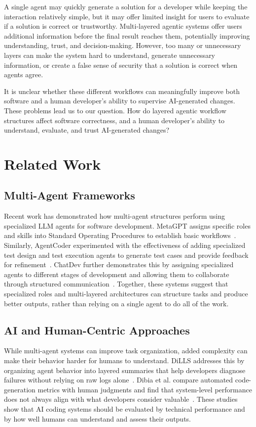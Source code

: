 \documentclass{chi-ext}
\begin{document}
A single agent may quickly generate a solution for a developer while keeping the interaction relatively simple, but it may offer limited insight for users to evaluate if a solution is correct or trustworthy. Multi-layered agentic systems offer users additional information before the final result reaches them, potentially improving understanding, trust, and decision-making. However, too many or unnecessary layers can make the system hard to understand, generate unnecessary information, or create a false sense of security that a solution is correct when agents agree. 

It is unclear whether these different workflows can meaningfully improve both software and a human developer's ability to supervise AI-generated changes. These problems lead us to our question. How do layered agentic workflow structures affect software correctness, and a human developer's ability to understand, evaluate, and trust AI-generated changes?

\section{Related Work}

\subsection{Multi-Agent Frameworks}
Recent work has demonstrated how multi-agent structures perform using specialized LLM agents for software development. MetaGPT assigns specific roles and skills into Standard Operating Procedures to establish basic workflows~\cite{hong2024metagpt}. Similarly, AgentCoder experimented with the effectiveness of adding specialized test design and test execution agents to generate test cases and provide feedback for refinement~\cite{huang2023agentcoder}. ChatDev further demonstrates this by assigning specialized agents to different stages of development and allowing them to collaborate through structured communication~\cite{qian2024chatdev}. Together, these systems suggest that specialized roles and multi-layered architectures can structure tasks and produce better outputs, rather than relying on a single agent to do all of the work.

\subsection{AI and Human-Centric Approaches}
While multi-agent systems can improve task organization, added complexity can make their behavior harder for humans to understand. DiLLS addresses this by organizing agent behavior into layered summaries that help developers diagnose failures without relying on raw logs alone~\cite{sheng2026dills}. Dibia et al. compare automated code-generation metrics with human judgments and find that system-level performance does not always align with what developers consider valuable~\cite{dibia2023aligning}. These studies show that AI coding systems should be evaluated by technical performance and by how well humans can understand and assess their outputs.
\end{document}
